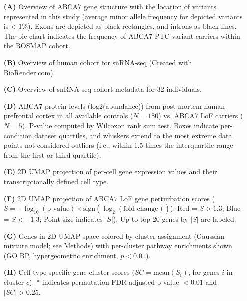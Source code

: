 \begin{itemize}
\item[\textbf{(A)}] Overview of ABCA7 gene structure with the location of variants represented in this study (average minor allele frequency for depicted variants is < 1\%). Exons are depicted as black rectangles, and introns as black lines. The pie chart indicates the frequency of ABCA7 PTC-variant-carriers within the ROSMAP cohort. 
\item[\textbf{(B)}] Overview of human cohort for snRNA-seq (Created with BioRender.com). 
\item[\textbf{(C)}] Overview of snRNA-seq cohort metadata for 32 individuals. 
\item[\textbf{(D)}] ABCA7 protein levels (log2(abundance)) from post-mortem human prefrontal cortex in all available controls ($N=180$) vs. ABCA7 LoF carriers ($N=5$). P-value computed by Wilcoxon rank sum test. Boxes indicate per-condition dataset quartiles, and whiskers extend to the most extreme data points not considered outliers (i.e., within 1.5 times the interquartile range from the first or third quartile). 
\item[\textbf{(E)}] 2D UMAP projection of per-cell gene expression values and their transcriptionally defined cell type. 
\item[\textbf{(F)}] 2D UMAP projection of ABCA7 LoF gene perturbation scores ($S = -\log_{10}(\text{p-value}) \times \text{sign}(\log_2(\text{fold change}))$); Red = $S>1.3$, Blue = $S<-1.3$; Point size indicates $|S|$). Up to top 20 genes by $|S|$ are labeled. 
\item[\textbf{(G)}] Genes in 2D UMAP space colored by cluster assignment (Gaussian mixture model; see Methods) with per-cluster pathway enrichments shown (GO BP, hypergeometric enrichment, $p<0.01$). 
\item[\textbf{(H)}] Cell type-specific gene cluster scores ($SC = \text{mean}(S_i)$, for genes $i$ in cluster $c$). * indicates permutation FDR-adjusted p-value $< 0.01$ and $|SC| > 0.25$.
\end{itemize}